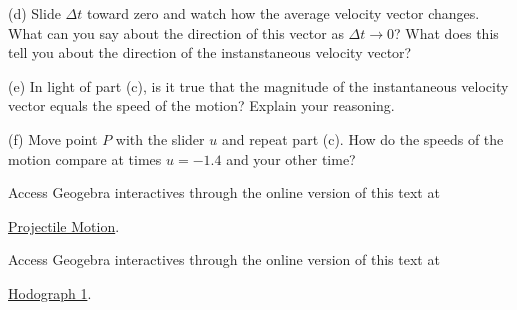 \documentclass{ximera}
\begin{document}
\begin{exploration}
\begin{question}
(d) Slide $\Delta t$ toward zero and watch how the average velocity vector changes. What can you say about the direction of this vector as $\Delta t \to 0$? What does this tell you about the direction of the instanstaneous velocity vector? 

(e) In light of part (c), is it true that the magnitude of the instantaneous velocity vector equals the speed of the motion? Explain your reasoning.

(f) Move point $P$ with the slider $u$ and repeat part (c). How do the speeds of the motion compare at times $u=-1.4$ and your other time? 
\end{question}


 
\begin{onlineOnly}
    \begin{center}
\end{center}
\end{onlineOnly}


Access Geogebra interactives through the online version of this text at
 
\href{https://www.geogebra.org/classic/egzphw3q}{Projectile Motion}.

\end{exploration}



\begin{exploration}
\begin{onlineOnly}
    \begin{center}
\end{center}
\end{onlineOnly}


Access Geogebra interactives through the online version of this text at

 
\href{https://www.geogebra.org/classic/jdsf9ttr}{Hodograph 1}.

\end{exploration}




\begin{exploration}
 
\begin{onlineOnly}
    \begin{center}
\end{center}
\end{onlineOnly}
\end{exploration}
\end{document}
